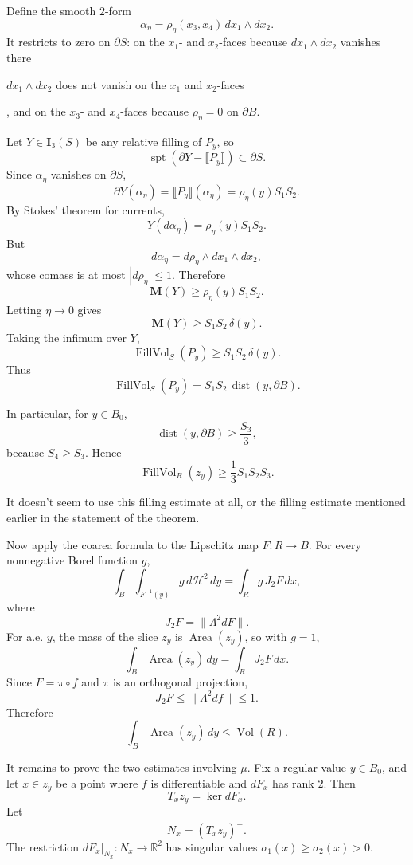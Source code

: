 \documentclass[12pt]{article}
\newcommand{\review}[1]{\begin{reviewbox}#1\end{reviewbox}}
\begin{document}
Define the smooth \(2\)-form
\[
\alpha_\eta=\rho_\eta(x_3,x_4)\,dx_1\wedge dx_2.
\]
It restricts to zero on \(\partial S\): on the \(x_1\)- and \(x_2\)-faces because \(dx_1\wedge dx_2\) vanishes there\review{\(dx_1\wedge dx_2\) does not vanish on the $x_1$ and $x_2$-faces}, and on the \(x_3\)- and \(x_4\)-faces because \(\rho_\eta=0\) on \(\partial B\).

Let \(Y\in\mathbf I_3(S)\) be any relative filling of \(P_y\), so
\[
\operatorname{spt}(\partial Y-\llbracket P_y\rrbracket)\subset \partial S.
\]
Since \(\alpha_\eta\) vanishes on \(\partial S\),
\[
\partial Y(\alpha_\eta)
=
\llbracket P_y\rrbracket(\alpha_\eta)
=
\rho_\eta(y)S_1S_2.
\]
By Stokes’ theorem for currents,
\[
Y(d\alpha_\eta)=\rho_\eta(y)S_1S_2.
\]
But
\[
d\alpha_\eta=d\rho_\eta\wedge dx_1\wedge dx_2,
\]
whose comass is at most \(|d\rho_\eta|\le 1\). Therefore
\[
\mathbf M(Y)\ge \rho_\eta(y)S_1S_2.
\]
Letting \(\eta\to 0\) gives
\[
\mathbf M(Y)\ge S_1S_2\,\delta(y).
\]
Taking the infimum over \(Y\),
\[
\operatorname{FillVol}_S(P_y)\ge S_1S_2\,\delta(y).
\]
Thus
\[
\operatorname{FillVol}_S(P_y)=S_1S_2\,\operatorname{dist}(y,\partial B).
\]

In particular, for \(y\in B_0\),
\[
\operatorname{dist}(y,\partial B)\ge \frac{S_3}{3},
\]
because \(S_4\ge S_3\). Hence
\[
\operatorname{FillVol}_R(z_y)\ge \frac13 S_1S_2S_3.
\]
\review{It doesn't seem to use this filling estimate at all, or the filling estimate mentioned earlier in the statement of the theorem.  }
Now apply the coarea formula to the Lipschitz map \(F:R\to B\). For every nonnegative Borel function \(g\),
\[
\int_B\int_{F^{-1}(y)} g\,d\mathcal H^2\,dy
=
\int_R g\,J_2F\,dx,
\]
where
\[
J_2F=\|\Lambda^2 dF\|.
\]
For a.e. \(y\), the mass of the slice \(z_y\) is \(\operatorname{Area}(z_y)\), so with \(g=1\),
\[
\int_B \operatorname{Area}(z_y)\,dy
=
\int_R J_2F\,dx.
\]
Since \(F=\pi\circ f\) and \(\pi\) is an orthogonal projection,
\[
J_2F\le \|\Lambda^2df\|\le 1.
\]
Therefore
\[
\int_B \operatorname{Area}(z_y)\,dy
\le
\operatorname{Vol}(R).
\]

It remains to prove the two estimates involving \(\mu\). Fix a regular value \(y\in B_0\), and let \(x\in z_y\) be a point where \(f\) is differentiable and \(dF_x\) has rank \(2\). Then
\[
T_xz_y=\ker dF_x.
\]
Let
\[
N_x=(T_xz_y)^\perp.
\]
The restriction \(dF_x|_{N_x}:N_x\to\mathbb R^2\) has singular values \(\sigma_1(x)\ge \sigma_2(x)>0\).
\end{document}
